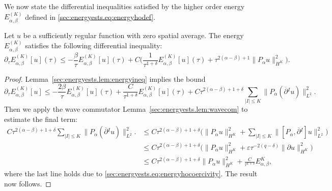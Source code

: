 \documentclass{article}
\newcommand{\ol}{\overline}
\newcommand{\ve}{\varepsilon}
\newcommand{\pa}{\partial}
\begin{document}
We now state the differential inequalities satisfied by the higher order energy $E_{\alpha,\beta}^{(K)}$ defined in \eqref{sec:energyests.eq:energyhodef}.
\begin{proposition}\label{sec:energyests.prop:energyhoineq}
    Let $u$ be a sufficiently regular function with zero spatial average. The energy $E_{\alpha,\beta}^{(K)}$ satisfies the following differential inequality:
    \begin{equation}\label{sec:energyests.eq:energyhoineq}
        \pa_\tau E_{\alpha,\beta}^{(K)}[u](\tau)  \leq -\frac{\beta}{\tau} E_{\alpha,\beta}^{(K)}[u](\tau) + C\Big(\frac{1}{\tau^{1+\delta}}E_{\alpha,\beta}^{(K)}[u](\tau) + \tau^{2(\alpha-\beta)+1}\|P_\alpha u\|_{H^K}^2\Big).
    \end{equation}
\end{proposition}
\begin{proof}
    Lemma~\ref{sec:energyests.lem:energyineq} implies the bound
    \begin{equation}\label{sec:energyests.eq:energyhoineqproof1}
        \pa_\tau E_{\alpha,\beta}^{(K)}[u]\leq -\frac{2\beta}{\tau} E_{\alpha,\beta}^{(K)}[u](\tau) + \frac{C}{\tau^{1+\delta}}E_{\alpha,\beta}^{(K)}[u](\tau) + C\tau^{2(\alpha-\beta)+1+\delta}\sum_{|I|\leq K}\|P_\alpha( \ol{\pa}{}^I u)\|_{L^2}^2.
    \end{equation}
    Then we apply the wave commutator Lemma~\ref{sec:energyests.lem:wavecom} to estimate the final term:
    \begin{align}
        C\tau^{2(\alpha-\beta)+1+\delta}\sum_{|I|\leq K}\|P_\alpha( \ol{\pa}{}^I u)\|_{L^2}^2. &\leq C\tau^{2(\alpha-\beta)+1+\delta}\Big(\|P_\alpha u\|_{H^K}^2 + \sum_{|I|\leq K}\|[P_\alpha,\ol{\pa}{}^I]u\|_{L^2}^2\Big)\nonumber\\
        &\leq C\tau^{2(\alpha-\beta)+1+\delta}\big(\|P_\alpha u\|_{H^K}^2 + \ve\tau^{-2(q-\delta)}\|\pa u\|_{H^K}^2\big)\nonumber\\
        &\leq C\tau^{2(\alpha-\beta)+1+\delta}\|P_\alpha u\|_{H^K}^2 + \frac{C}{\tau^{1+\delta}}E_{\alpha,\beta}^K,\label{sec:energyests.eq:energyhoineqproof2}
    \end{align}
    where the last line holds due to \eqref{sec:energyests.eq:energyhocoercivity}. The result now follows.
\end{proof}
\end{document}
